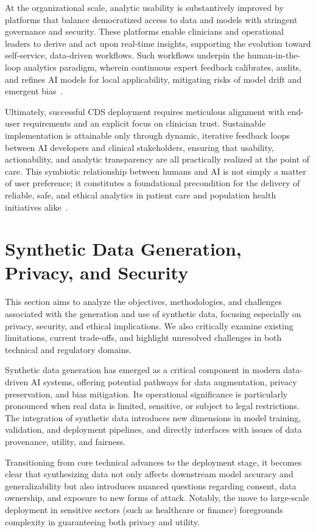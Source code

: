 \documentclass[sigconf]{acmart}
\begin{document}
At the organizational scale, analytic usability is substantively improved by platforms that balance democratized access to data and models with stringent governance and security. These platforms enable clinicians and operational leaders to derive and act upon real-time insights, supporting the evolution toward self-service, data-driven workflows. Such workflows underpin the human-in-the-loop analytics paradigm, wherein continuous expert feedback calibrates, audits, and refines AI models for local applicability, mitigating risks of model drift and emergent bias~\cite{ref84,ref106}.

Ultimately, successful CDS deployment requires meticulous alignment with end-user requirements and an explicit focus on clinician trust. Sustainable implementation is attainable only through dynamic, iterative feedback loops between AI developers and clinical stakeholders, ensuring that usability, actionability, and analytic transparency are all practically realized at the point of care. This symbiotic relationship between humans and AI is not simply a matter of user preference; it constitutes a foundational precondition for the delivery of reliable, safe, and ethical analytics in patient care and population health initiatives alike~\cite{ref87,ref99,ref106}.

\section{Synthetic Data Generation, Privacy, and Security}

This section aims to analyze the objectives, methodologies, and challenges associated with the generation and use of synthetic data, focusing especially on privacy, security, and ethical implications. We also critically examine existing limitations, current trade-offs, and highlight unresolved challenges in both technical and regulatory domains.

Synthetic data generation has emerged as a critical component in modern data-driven AI systems, offering potential pathways for data augmentation, privacy preservation, and bias mitigation. Its operational significance is particularly pronounced when real data is limited, sensitive, or subject to legal restrictions. The integration of synthetic data introduces new dimensions in model training, validation, and deployment pipelines, and directly interfaces with issues of data provenance, utility, and fairness.

Transitioning from core technical advances to the deployment stage, it becomes clear that synthesizing data not only affects downstream model accuracy and generalizability but also introduces nuanced questions regarding consent, data ownership, and exposure to new forms of attack. Notably, the move to large-scale deployment in sensitive sectors (such as healthcare or finance) foregrounds complexity in guaranteeing both privacy and utility.
\end{document}
